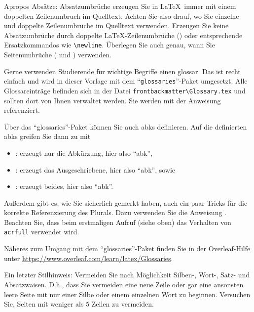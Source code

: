 Apropos Absätze: {\color{red}Absatzumbrüche erzeugen Sie in \LaTeX\ immer mit einem doppelten Zeilenumbruch im Quelltext.} Achten Sie also drauf, wo Sie einzelne und doppelte Zeilenumbrüche im Quelltext verwenden. Erzeugen Sie keine Absatzumbrüche durch doppelte \LaTeX{}-Zeilenumbrüche (\inlinecode{\textbackslash\textbackslash\textbackslash\textbackslash}) oder entsprechende Ersatzkommandos wie \texttt{\textbackslash newline}. Überlegen Sie auch genau, wann Sie Seitenumbrüche ( und ) verwenden.

Gerne verwenden Studierende für wichtige Begriffe einen \Gls{glossar}. Das ist recht einfach und wird in dieser Vorlage mit dem \enquote{\texttt{glossaries}}-Paket umgesetzt. Alle Glossareinträge befinden sich in der Datei \texttt{frontbackmatter\textbackslash Glossary.tex} und sollten dort von Ihnen verwaltet werden. Sie werden mit der Anweisung  referenziert.

Über das \enquote{glossaries}-Paket können Sie auch \Glspl{abk} definieren. Auf die definierten \Glspl{abk} greifen Sie dann zu mit
\begin{itemize}
    \item {}: erzeugt nur die Abkürzung, hier also \enquote{\acrshort{abk}},
    \item {}: erzeugt das Ausgeschriebene, hier also \enquote{\acrlong{abk}}, sowie
    \item {}: erzeugt beides, hier also \enquote{\acrfull{abk}}.
\end{itemize}

Außerdem gibt es, wie Sie sicherlich gemerkt haben, auch ein paar Tricks für die korrekte Referenzierung des Plurals. Dazu verwenden Sie die Anweisung . Beachten Sie, dass beim erstmaligen Aufruf (siehe oben) das Verhalten von \texttt{acrfull} verwendet wird.

Näheres zum Umgang mit dem \enquote{glossaries}-Paket finden Sie in der Overleaf-Hilfe unter \url{https://www.overleaf.com/learn/latex/Glossaries}.

Ein letzter Stilhinweis: Vermeiden Sie nach Möglichkeit Silben-, Wort-, Satz- und Absatzwaisen. D.h., dass Sie vermeiden eine neue Zeile oder gar eine ansonsten leere Seite mit nur einer Silbe oder einem einzelnen Wort zu beginnen. Versuchen Sie, Seiten mit weniger als $5$ Zeilen zu vermeiden.

